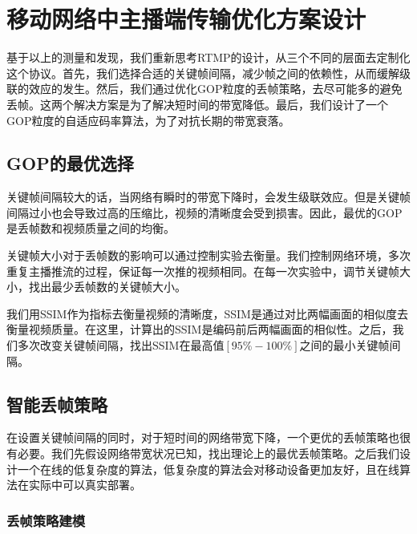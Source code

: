 \chapter{移动网络中主播端传输优化方案设计}
基于以上的测量和发现，我们重新思考RTMP的设计，从三个不同的层面去定制化这个协议。首先，我们选择合适的关键帧间隔，减少帧之间的依赖性，从而缓解级联的效应的发生。然后，我们通过优化GOP粒度的丢帧策略，去尽可能多的避免丢帧。这两个解决方案是为了解决短时间的带宽降低。最后，我们设计了一个GOP粒度的自适应码率算法，为了对抗长期的带宽衰落。
\section{GOP的最优选择}
\label{sec:design_gop}
关键帧间隔较大的话，当网络有瞬时的带宽下降时，会发生级联效应。但是关键帧间隔过小也会导致过高的压缩比，视频的清晰度会受到损害。因此，最优的GOP是丢帧数和视频质量之间的均衡。

关键帧大小对于丢帧数的影响可以通过控制实验去衡量。我们控制网络环境，多次重复主播推流的过程，保证每一次推的视频相同。在每一次实验中，调节关键帧大小，找出最少丢帧数的关键帧大小。

我们用SSIM作为指标去衡量视频的清晰度，SSIM是通过对比两幅画面的相似度去衡量视频质量。在这里，计算出的SSIM是编码前后两幅画面的相似性。之后，我们多次改变关键帧间隔，找出SSIM在最高值$[95\%-100\%]$之间的最小关键帧间隔。

\section{智能丢帧策略}
在设置关键帧间隔的同时，对于短时间的网络带宽下降，一个更优的丢帧策略也很有必要。我们先假设网络带宽状况已知，找出理论上的最优丢帧策略。之后我们设计一个在线的低复杂度的算法，低复杂度的算法会对移动设备更加友好，且在线算法在实际中可以真实部署。

\subsection{丢帧策略建模}

